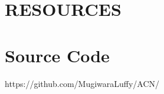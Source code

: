 \documentclass[portrait,a1]{a0poster}
\begin{document}
\begin{multicols}{2}

\color{SaddleBrown} %



\color{DarkSlateGray} %





\color{SaddleBrown}
\section*{RESOURCES}
\color{DarkSlateGray}
\section*{Source Code}
https://github.com/MugiwaraLuffy/ACN/
\nocite{*} %





\end{multicols}
\end{document}
